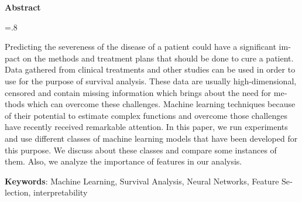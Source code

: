 


\pagestyle{empty}

\begin{latin}

\begin{center}
\textbf{Abstract}
\end{center}
\baselineskip=.8\baselineskip

Predicting the severeness of the disease of a patient could have a significant impact on the methods and treatment plans that should be done to cure a patient. Data gathered from clinical treatments and other studies can be used in order to use for the purpose of survival analysis. These data are usually high-dimensional, censored and contain missing information which brings about the need for methods which can overcome these challenges. Machine learning techniques because of their potential to estimate complex functions and overcome those challenges have recently received remarkable attention. In this paper, we run experiments and use different classes of machine learning models that have been developed for this purpose. We discuss about these classes and compare some instances of
them. Also, we analyze the importance of features in our analysis.


\bigskip\noindent\textbf{Keywords}:
Machine Learning, Survival Analysis, Neural Networks, Feature Selection, interpretability

\end{latin}

\newpage
